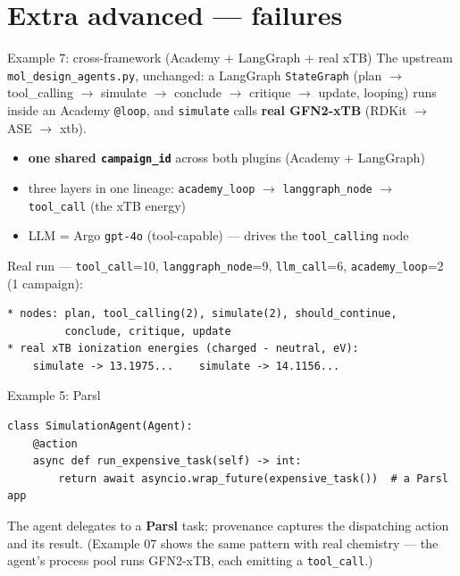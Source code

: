 \documentclass[aspectratio=169,11pt]{beamer}
\begin{document}
\section{Extra advanced --- failures}

\begin{frame}[fragile]{Example 7: cross-framework (Academy + LangGraph + real xTB)}
  The upstream \texttt{mol\_design\_agents.py}, \alert{unchanged}: a LangGraph
  \texttt{StateGraph} (plan $\to$ tool\_calling $\to$ simulate $\to$ conclude $\to$
  critique $\to$ update, looping) runs inside an Academy \texttt{@loop}, and
  \texttt{simulate} calls \textbf{real GFN2-xTB} (RDKit $\to$ ASE $\to$ xtb).
  \begin{itemize}\small
    \item \textbf{one shared \texttt{campaign\_id}} across both plugins (Academy + LangGraph)
    \item three layers in one lineage: \texttt{academy\_loop} $\to$
      \texttt{langgraph\_node} $\to$ \texttt{tool\_call} (the xTB energy)
    \item LLM = Argo \texttt{gpt-4o} (tool-capable) --- drives the \texttt{tool\_calling} node
  \end{itemize}
  \small Real run --- \texttt{tool\_call}=10, \texttt{langgraph\_node}=9,
  \texttt{llm\_call}=6, \texttt{academy\_loop}=2 (1 campaign):
\begin{lstlisting}[style=sh]
* nodes: plan, tool_calling(2), simulate(2), should_continue,
         conclude, critique, update
* real xTB ionization energies (charged - neutral, eV):
    simulate -> 13.1975...    simulate -> 14.1156...
\end{lstlisting}
\end{frame}

\begin{frame}[fragile]{Example 5: Parsl}
\begin{lstlisting}
class SimulationAgent(Agent):
    @action
    async def run_expensive_task(self) -> int:
        return await asyncio.wrap_future(expensive_task())  # a Parsl app
\end{lstlisting}
  \small The agent delegates to a \textbf{Parsl} task; provenance captures the
  dispatching action and its result. (Example 07 shows the same pattern with real
  chemistry --- the agent's process pool runs GFN2-xTB, each emitting a
  \texttt{tool\_call}.)
\end{frame}
\end{document}
